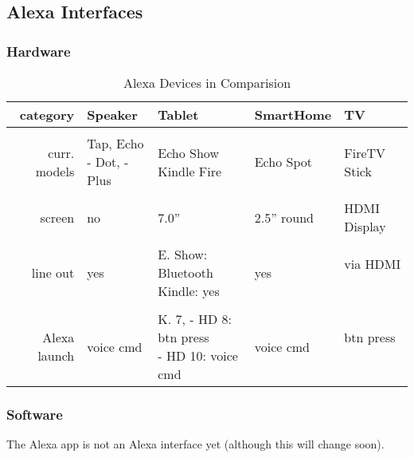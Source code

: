 \clearpage

\subsection*{Alexa Interfaces}

\subsubsection*{Hardware}
\begin{table}[htbp]
	\caption{Alexa Devices in Comparision}\label{alexaDeviceTable}
	\begin{tabularx}{\textwidth}{  r | l l l l  }
		
		category		& Speaker							& Tablet	& SmartHome	& TV	\\ \hline \hline \\
		curr. models	& \shortstack[l]{Tap, Echo \\ - Dot, - Plus}     & \shortstack[l]{Echo Show \\ Kindle Fire}    & Echo Spot & FireTV Stick \\ \hline \\
		screen  		& no      & 7.0'' 		& 2.5'' round				&  HDMI Display      \\ \hline \\
		line out		& yes      					        & \shortstack[l]{E. Show: Bluetooth \\ Kindle: yes} & 	yes & \shortstack{via HDMI \\ \textcolor{white}{text} }      \\ \hline \\
		Alexa launch 	& voice	cmd					& \shortstack[l]{K. 7, - HD 8:  btn press \\ - HD 10: voice cmd} & voice cmd & \shortstack{btn press \\ \textcolor{white}{text} }
	\end{tabularx}
\end{table}



\subsubsection*{Software}

The Alexa app is not an Alexa interface yet (although this will change soon).

